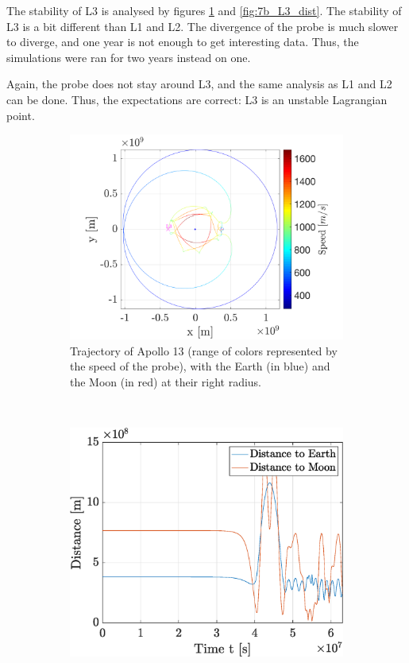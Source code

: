 \documentclass[a4paper,12pt,twoside]{article}
\begin{document}
The stability of L3 is analysed by figures \ref{fig:7b_L3_traj} and \ref{fig:7b_L3_dist}.
The stability of L3 is a bit different than L1 and L2.
The divergence of the probe is much slower to diverge, and one year is not enough to get interesting data.
Thus, the simulations were ran for two years instead on one.

Again, the probe does not stay around L3, and the same analysis as L1 and L2 can be done.
Thus, the expectations are correct: L3 is an unstable Lagrangian point.

\begin{figure}[h]
  \centering
  \begin{subfigure}[t]{0.55\textwidth}
    \includegraphics[width=\textwidth]{graphs/ex7b_L3_traj.png}
    \caption{Trajectory of Apollo 13 (range of colors represented by the speed of the probe), with the Earth (in blue) and the Moon (in red) at their right radius.}
    \label{fig:7b_L3_traj}
  \end{subfigure}
  ~
  \begin{subfigure}[t]{0.4\textwidth}
    \includegraphics[width=\textwidth]{graphs/ex7b_L3_dist.eps}

\end{subfigure}
\end{figure}
\end{document}
